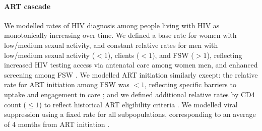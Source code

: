 \paragraph{ART cascade}
We modelled rates of HIV diagnosis among people living with HIV as monotonically increasing over time.
We defined a base rate for women with low/medium sexual activity,
and constant relative rates for
men with low/medium sexual activity ($<1$), clients ($<1$), and FSW ($>1$),
reflecting increased HIV testing access via antenatal care among women \vs men,
and enhanced screening among FSW \cite{Baral2014}.
We modelled ART initiation similarly except:
the relative rate for ART initiation among FSW was $<1$,
reflecting specific barriers to uptake and engagement in care \cite{Schwartz2017}; and
we defined additional relative rates by CD4 count ($\le1$)
to reflect historical ART eligibility criteria \cite{SHIMS2}.
We modelled viral suppression using a fixed rate for all subpopulations,
corresponding to an average of 4 months from ART initiation \cite{Mujugira2016}.
